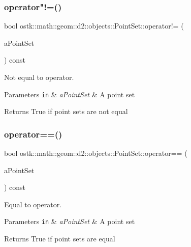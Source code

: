 \subsubsection{\texorpdfstring{operator"!=()}{operator!=()}}
{\footnotesize\ttfamily bool ostk\+::math\+::geom\+::d2\+::objects\+::\+Point\+Set\+::operator!= (\begin{DoxyParamCaption}\item[{const \hyperlink{classostk_1_1math_1_1geom_1_1d2_1_1objects_1_1_point_set}{Point\+Set} \&}]{a\+Point\+Set }\end{DoxyParamCaption}) const}



Not equal to operator. 


\begin{DoxyParams}[1]{Parameters}
\mbox{\tt in}  & {\em a\+Point\+Set} & A point set \\
\hline
\end{DoxyParams}
\begin{DoxyReturn}{Returns}
True if point sets are not equal 
\end{DoxyReturn}
\mbox{\label{classostk_1_1math_1_1geom_1_1d2_1_1objects_1_1_point_set_adab3ff08c4e5413822f35408be2f2ec1}} 
\subsubsection{\texorpdfstring{operator==()}{operator==()}}
{\footnotesize\ttfamily bool ostk\+::math\+::geom\+::d2\+::objects\+::\+Point\+Set\+::operator== (\begin{DoxyParamCaption}\item[{const \hyperlink{classostk_1_1math_1_1geom_1_1d2_1_1objects_1_1_point_set}{Point\+Set} \&}]{a\+Point\+Set }\end{DoxyParamCaption}) const}



Equal to operator. 


\begin{DoxyParams}[1]{Parameters}
\mbox{\tt in}  & {\em a\+Point\+Set} & A point set \\
\hline
\end{DoxyParams}
\begin{DoxyReturn}{Returns}
True if point sets are equal 
\end{DoxyReturn}
\mbox{\label{classostk_1_1math_1_1geom_1_1d2_1_1objects_1_1_point_set_aef3263b63b2e9c9667365f58faee9ac7}} 
